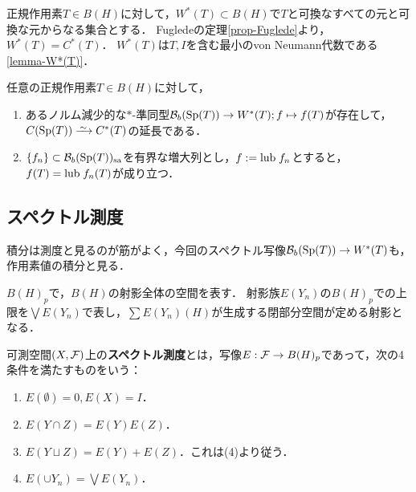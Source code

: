 \documentclass[uplatex,dvipdfmx]{jsreport}
\begin{document}
\begin{notation}[可換な元の代数]\label{notation-W*(T)}
    正規作用素$T\in B(H)$に対して，$W^*(T)\subset B(H)$で$T$と可換なすべての元と可換な元からなる集合とする．
    Fugledeの定理\ref{prop-Fuglede}より，$W^*(T)=C^*(T)$．
    $W^*(T)$は$T,I$を含む最小のvon Neumann代数である\ref{lemma-W*(T)}．
\end{notation}

\begin{theorem}
    任意の正規作用素$T\in B(H)$に対して，
    \begin{enumerate}
        \item あるノルム減少的な$*$-準同型$\mathcal{B}_b(\mathrm{Sp}(T))\to W^*(T);f\mapsto f(T)$が存在して，$C(\Sp(T))\iso C^*(T)$の延長である．
        \item $\{f_n\}\subset\mathcal{B}_b(\mathrm{Sp}(T))_{\mathrm{sa}}$を有界な増大列とし，$f:=\mathrm{lub}\; f_n$とすると，$f(T)=\mathrm{lub}\; f_n(T)$が成り立つ．
    \end{enumerate}
\end{theorem}

\subsection{スペクトル測度}

\begin{tcolorbox}[colframe=ForestGreen, colback=ForestGreen!10!white,breakable,colbacktitle=ForestGreen!40!white,coltitle=black,fonttitle=\bfseries\sffamily,
title=]
    積分は測度と見るのが筋がよく，今回のスペクトル写像$\mathcal{B}_b(\mathrm{Sp}(T))\to W^*(T)$も，作用素値の積分と見る．
\end{tcolorbox}

\begin{notation}
    $B(H)_p$で，$B(H)$の射影全体の空間を表す．
    射影族$E(Y_n)$の$B(H)_p$での上限を$\bigvee E(Y_n)$で表し，$\sum E(Y_n)(H)$が生成する閉部分空間が定める射影となる．
\end{notation}

\begin{definition}
    可測空間$(X,\mathcal{F})$上の\textbf{スペクトル測度}とは，写像$E:\mathcal{F}\to B(H)_p$であって，次の4条件を満たすものをいう：
    \begin{enumerate}
        \item $E(\emptyset)=0,E(X)=I$．
        \item $E(Y\cap Z)=E(Y)E(Z)$．
        \item $E(Y\sqcup Z)=E(Y)+E(Z)$．これは(4)より従う．
        \item $E(\cup Y_n)=\bigvee E(Y_n)$．
    \end{enumerate}
\end{definition}
\end{document}
